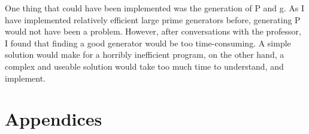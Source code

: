 \documentclass{article}
\begin{document}
One thing that could have been implemented was the generation of P and g. As I have implemented relatively efficient large prime generators before, generating P would not have been a problem. However, after conversations with the professor, I found that finding a good generator would be too time-consuming. A simple solution would make for a horribly inefficient program, on the other hand, a complex and useable solution would take too much time to understand, and implement.

\newpage

\nocite{*}




\newpage

\section{Appendices}
\end{document}

